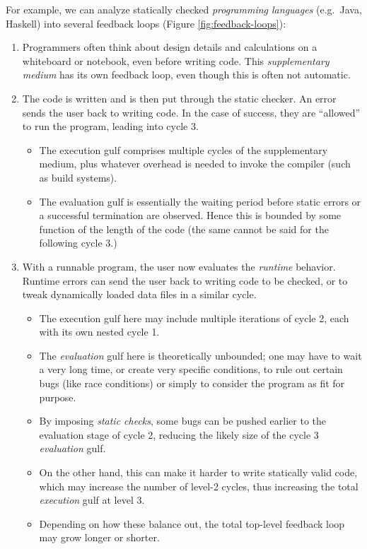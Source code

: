 \documentclass[english,submission]{programming}
\begin{document}
For example, we can analyze statically checked \emph{programming
languages} (e.g.~Java, Haskell) into several feedback loops (Figure
\ref{fig:feedback-loops}):

\begin{enumerate}
\def\labelenumi{\arabic{enumi}.}
\item
  Programmers often think about design details and calculations on a
  whiteboard or notebook, even before writing code. This
  \emph{supplementary medium} has its own feedback loop, even though
  this is often not automatic.
\item
  The code is written and is then put through the static checker. An
  error sends the user back to writing code. In the case of success,
  they are ``allowed'' to run the program, leading into cycle 3.

  \begin{itemize}
  \tightlist
  \item
    The execution gulf comprises multiple cycles of the supplementary
    medium, plus whatever overhead is needed to invoke the compiler
    (such as build systems).
  \item
    The evaluation gulf is essentially the waiting period before static
    errors or a successful termination are observed. Hence this is
    bounded by some function of the length of the code (the same cannot
    be said for the following cycle 3.)
  \end{itemize}
\item
  With a runnable program, the user now evaluates the \emph{runtime}
  behavior. Runtime errors can send the user back to writing code to be
  checked, or to tweak dynamically loaded data files in a similar cycle.

  \begin{itemize}
  \tightlist
  \item
    The execution gulf here may include multiple iterations of cycle 2,
    each with its own nested cycle 1.
  \item
    The \emph{evaluation} gulf here is theoretically unbounded; one may
    have to wait a very long time, or create very specific conditions,
    to rule out certain bugs (like race conditions) or simply to
    consider the program as fit for purpose.
  \item
    By imposing \emph{static checks}, some bugs can be pushed earlier to
    the evaluation stage of cycle 2, reducing the likely size of the
    cycle 3 \emph{evaluation} gulf.
  \item
    On the other hand, this can make it harder to write statically valid
    code, which may increase the number of level-2 cycles, thus
    increasing the total \emph{execution} gulf at level 3.
  \item
    Depending on how these balance out, the total top-level feedback
    loop may grow longer or shorter.
  \end{itemize}
\end{enumerate}
\end{document}
